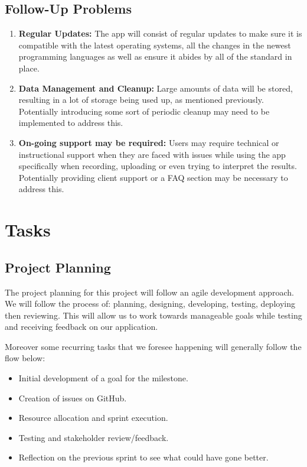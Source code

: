 \documentclass[12pt]{article}
\begin{document}
\subsection{Follow-Up Problems}

\begin{enumerate}
  \item \textbf{Regular Updates:} The app will consist of regular updates to make sure it is compatible with the latest 
  operating systems, all the changes in the newest programming languages as well as ensure it abides by all of the standard 
  in place.
  \item \textbf{Data Management and Cleanup:} Large amounts of data will be stored, resulting in a lot of storage being used up, 
  as mentioned previously. Potentially introducing some sort of periodic cleanup may need to be implemented to address this. 
  \item \textbf{On-going support may be required:} Users may require technical or instructional support when they are faced with 
  issues while using the app specifically when recording, uploading or even trying to interpret the results. Potentially providing 
  client support or a FAQ section may be necessary to address this.
\end{enumerate}

\section{Tasks}
\subsection{Project Planning}
The project planning for this project will follow an agile development approach. We will follow the process of: planning, designing, developing, testing, deploying then reviewing. This will allow us to work towards manageable goals while testing and receiving feedback on our application. 


Moreover some recurring tasks that we foresee happening will generally follow the flow below:
\begin{itemize}
  \item Initial development of a goal for the milestone.
  \item Creation of issues on GitHub.
  \item Resource allocation and sprint execution.
  \item Testing and stakeholder review/feedback.
  \item Reflection on the previous sprint to see what could have gone better.
\end{itemize}
\end{document}
